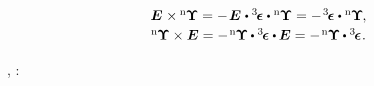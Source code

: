 \nopagebreak\vspace{-0.2em}\begin{equation*}\begin{array}{c}
\UnitDyad \hspace{.1ex} \times \hspace{-0.1ex} {^\mathrm{n}\hspace{-0.12ex}\bm{\Upsilon}}
= - \hspace{.2ex} \UnitDyad \hspace{.1ex} \dotp \permutationsparitytensor \dotp {^\mathrm{n}\hspace{-0.12ex}\bm{\Upsilon}}
= - \hspace{.2ex} \permutationsparitytensor \dotp {^\mathrm{n}\hspace{-0.12ex}\bm{\Upsilon}} \hspace{-0.15ex},
\\[.2em]
%
{^\mathrm{n}\hspace{-0.12ex}\bm{\Upsilon}} \times \UnitDyad
= - \hspace{.2ex} {^\mathrm{n}\hspace{-0.12ex}\bm{\Upsilon}} \hspace{-0.1ex} \dotp \permutationsparitytensor \dotp \hspace{-0.1ex} \UnitDyad
= - \hspace{.2ex} {^\mathrm{n}\hspace{-0.12ex}\bm{\Upsilon}} \hspace{-0.1ex} \dotp \permutationsparitytensor
\hspace{.1ex} .
\end{array}\end{equation*}

\vspace{-0.1em}
,
:

